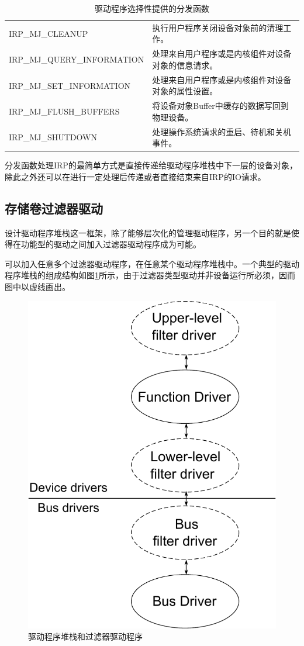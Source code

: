 \begin{table}[H]
\centering
\caption{驱动程序选择性提供的分发函数}
\begin{tabular}{|ll|}
\hline IRP\_MJ\_CLEANUP & 执行用户程序关闭设备对象前的清理工作。 \\
       IRP\_MJ\_QUERY\_INFORMATION & 处理来自用户程序或是内核组件对设备对象的信息请求。 \\
       IRP\_MJ\_SET\_INFORMATION & 处理来自用户程序或是内核组件对设备对象的属性设置。 \\
       IRP\_MJ\_FLUSH\_BUFFERS & 将设备对象Buffer中缓存的数据写回到物理设备。 \\
       IRP\_MJ\_SHUTDOWN & 处理操作系统请求的重启、待机和关机事件。 \\
\hline
\end{tabular}
\label{tab:option-handled-major-function}
\end{table}

分发函数处理IRP的最简单方式是直接传递给驱动程序堆栈中下一层的设备对象，除此之外还可以在进行一定处理后传递或者直接结束来自IRP的IO请求。

\subsection{存储卷过滤器驱动}
设计驱动程序堆栈这一框架，除了能够层次化的管理驱动程序，另一个目的就是使得在功能型的驱动之间加入过滤器驱动程序\cite{filterdrv2004}成为可能。

可以加入任意多个过滤器驱动程序，在任意某个驱动程序堆栈中。一个典型的驱动程序堆栈的组成结构如图\ref{fig:io-stack-filter}所示，由于过滤器类型驱动并非设备运行所必须，因而图中以虚线画出。
\begin{figure}[H]
\centering
\includegraphics[width=0.4\linewidth]{./graph/io-stack-filter}
\caption{驱动程序堆栈和过滤器驱动程序}
\label{fig:io-stack-filter}
\end{figure}

